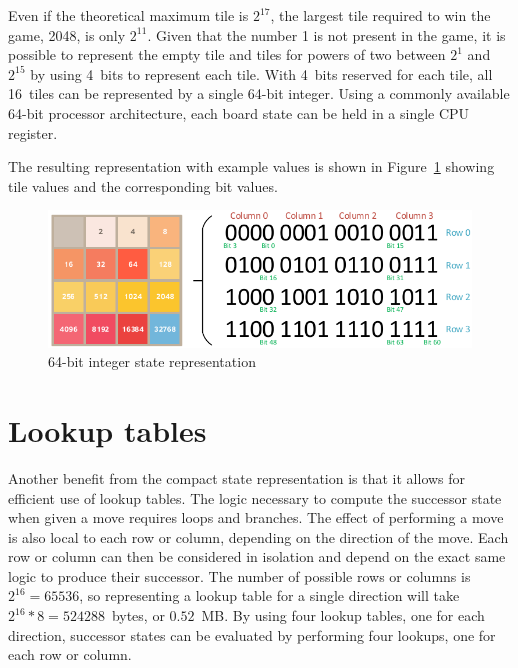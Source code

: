 Even if the theoretical maximum tile is $2^{17}$, the largest tile required to win the game, 2048, is only $2^{11}$. Given that the number 1 is not present in the game, it is possible to represent the empty tile and tiles for powers of two between $2^1$ and $2^{15}$ by using 4~bits to represent each tile. With 4~bits reserved for each tile, all 16~tiles can be represented by a single 64-bit integer. Using a commonly available 64-bit processor architecture, each board state can be held in a single CPU register.

The resulting representation with example values is shown in Figure~\ref{figure:represent} showing tile values and the corresponding bit values.

\begin{figure}[H]
\centering
\includegraphics[scale=1.0]{images/2048_state}
\caption{64-bit integer state representation}
\label{figure:represent}
\end{figure}

\section*{Lookup tables}

Another benefit from the compact state representation is that it allows for efficient use of lookup tables. The logic necessary to compute the successor state when given a move requires loops and branches. The effect of performing a move is also local to each row or column, depending on the direction of the move. Each row or column can then be considered in isolation and depend on the exact same logic to produce their successor. The number of possible rows or columns is $2^{16}=65536$, so representing a lookup table for a single direction will take $2^{16}*8=524288$~bytes, or $0.52$~MB. By using four lookup tables, one for each direction, successor states can be evaluated by performing four lookups, one for each row or column.

